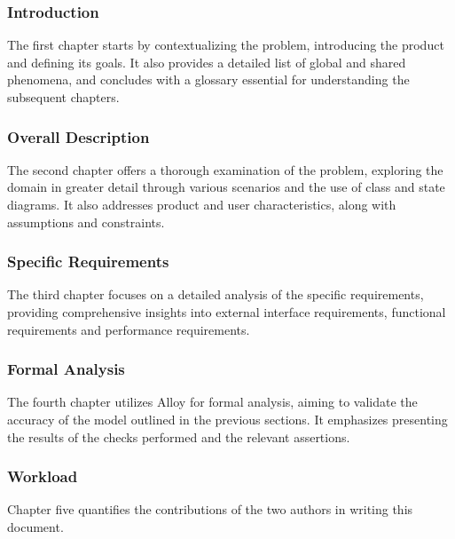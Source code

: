 \subsubsection{Introduction}
The first chapter starts by contextualizing the problem, introducing the product and defining its goals.
It also provides a detailed list of global and shared phenomena, and concludes with a glossary essential for understanding the subsequent chapters.

\subsubsection{Overall Description}
The second chapter offers a thorough examination of the problem, exploring the domain in greater detail through various scenarios and the use of class and state diagrams.
It also addresses product and user characteristics, along with assumptions and constraints.

\subsubsection{Specific Requirements}
The third chapter focuses on a detailed analysis of the specific requirements, providing comprehensive insights into external interface requirements, functional requirements and performance requirements.

\subsubsection{Formal Analysis}
The fourth chapter utilizes Alloy for formal analysis, aiming to validate the accuracy of the model outlined in the previous sections.
It emphasizes presenting the results of the checks performed and the relevant assertions.

\subsubsection{Workload}
Chapter five quantifies the contributions of the two authors in writing this document.
